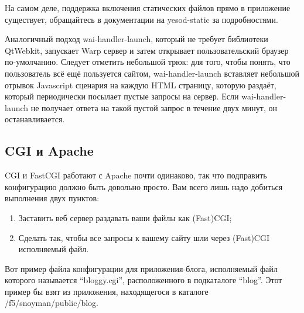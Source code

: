 На самом деле, поддержка включения статических файлов прямо в приложение существует, обращайтесь в документации на yesod-static за подробностями.
%

Аналогичный подход wai-handler-launch, который не требует библиотеки QtWebkit, запускает Warp сервер и затем открывает пользовательский браузер по-умолчанию. Следует отметить небольшой трюк: для того, чтобы понять, что пользователь всё ещё пользуется сайтом, wai-handler-launch вставляет небольшой отрывок Javascript сценария на каждую HTML страницу, которую раздаёт, который периодически посылает пустые запросы на сервер. Если wai-handler-launch не получает ответа на такой пустой запрос в течение двух минут, он останавливается.
%
\subsection{CGI и Apache}
%
%
%
CGI и FastCGI работают с Apache почти одинаково, так что подправить конфигурацию должно быть довольно просто. Вам всего лишь надо добиться выполнения двух пунктов:
\begin{enumerate}
  \item Заставить веб сервер раздавать ваши файлы как (Fast)CGI;
  \item Сделать так, чтобы все запросы к вашему сайту шли через (Fast)CGI исполняемый файл.
\end{enumerate}

%
Вот пример файла конфигурации для приложения-блога, исполняемый файл которого называется ``bloggy.cgi'', расположенного в подкаталоге ``blog''. Этот пример бы взят из приложения, находящегося в каталоге /f5/snoyman/public/blog.

